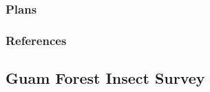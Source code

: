 \begin{refsection}
\begin{comment}
	\begin{btSect}[vancouver]{zotero}
	\btPrintCited
	\end{btSect}
	\end{comment}
	
	\subsubsection{Plans}
	
	\subsubsection{References}
	\printbibliography[heading=none]
\end{refsection}

\pagebreak

\subsection{Guam Forest Insect Survey}
